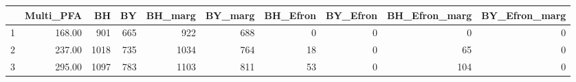 \begin{table}[ht]
\centering
\begin{tabular}{rrrrrrrrrr}
  \hline
 & Multi\_PFA & BH & BY & BH\_marg & BY\_marg & BH\_Efron & BY\_Efron & BH\_Efron\_marg & BY\_Efron\_marg \\ 
  \hline
1 & 168.00 & 901 & 665 & 922 & 688 &   0 &   0 &   0 &   0 \\ 
  2 & 237.00 & 1018 & 735 & 1034 & 764 &  18 &   0 &  65 &   0 \\ 
  3 & 295.00 & 1097 & 783 & 1103 & 811 &  53 &   0 & 104 &   0 \\ 
   \hline
\end{tabular}
\end{table}
